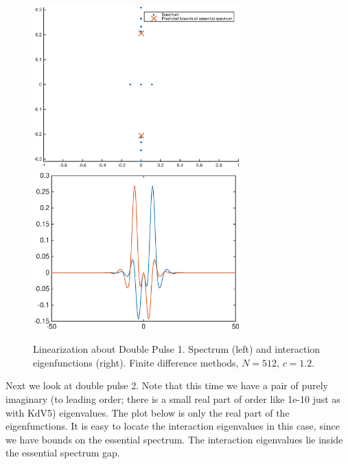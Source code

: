\documentclass[12pt]{article}
\begin{document}
\begin{figure}[H]
\centering
\includegraphics[width=8cm]{spec12_double1.eps}
\includegraphics[width=8cm]{evecs12_double1.eps}
\caption{Linearization about Double Pulse 1. Spectrum (left) and interaction eigenfunctions (right). Finite difference methods, $N = 512$, $c = 1.2$.}
\end{figure}

Next we look at double pulse 2. Note that this time we have a pair of purely imaginary (to leading order; there is a small real part of order like 1e-10 just as with KdV5) eigenvalues. The plot below is only the real part of the eigenfunctions. It is easy to locate the interaction eigenvalues in this case, since we have bounds on the essential spectrum. The interaction eigenvalues lie inside the essential spectrum gap.
\end{document}
